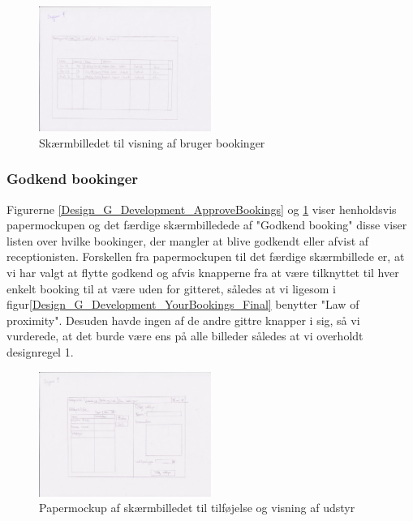 \begin{figure}[h!]
  \centering
    \includegraphics[width=0.5\textwidth]{Appendix/GUI-Prototype/PaperMockup/GodkendBookinger_001}
  \caption{Skærmbilledet til visning af bruger bookinger}
\label{Design_G_Development_ApproveBookings_Final}
\end{figure}

\subsubsection{Godkend bookinger}
Figurerne \ref{Design_G_Development_ApproveBookings} og \ref{Design_G_Development_ApproveBookings_Final} viser henholdsvis papermockupen og det færdige skærmbilledede af "Godkend booking"  disse viser listen over hvilke bookinger, der mangler at blive godkendt eller afvist af receptionisten. Forskellen fra papermockupen til det færdige skærmbillede er, at vi har valgt at flytte godkend og afvis knapperne fra at være tilknyttet til hver enkelt booking til at være uden for gitteret, således at vi ligesom i figur\ref{Design_G_Development_YourBookings_Final} benytter "Law of proximity". Desuden havde ingen af de andre gittre knapper i sig, så vi vurderede, at det burde være ens på alle billeder således at vi overholdt designregel 1.

\begin{figure}[h!]
  \centering
    \includegraphics[width=0.5\textwidth]{Appendix/GUI-Prototype/PaperMockup/UdstyrsListe}
  \caption{Papermockup af skærmbilledet til tilføjelse og visning af udstyr}
\label{Design_G_Development_EquipmentList}
\end{figure}

